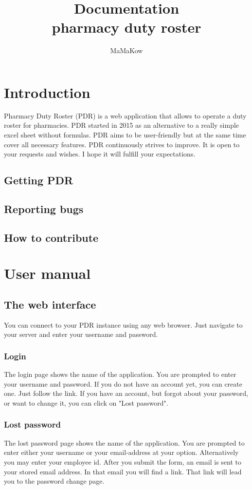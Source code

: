 \documentclass[12pt,a4paper,titlepage]{book}
\author{MaMaKow}
\title{Documentation \\pharmacy duty roster}
\begin{document}
\maketitle
\tableofcontents


\chapter{Introduction}
Pharmacy Duty Roster (PDR) is a web application that allows to operate a duty roster for pharmacies.
PDR started in 2015 as an alternative to a really simple excel sheet without formulas.
PDR aims to be user-friendly but at the same time cover all necessary features.
PDR continuously strives to improve. It is open to your requests and wishes.
I hope it will fulfill your expectations.
\section{Getting PDR}
\section{Reporting bugs}
\section{How to contribute}


\chapter{User manual}


\section{The web interface}
You can connect to your PDR instance using any web browser. Just navigate to your server and enter your username and password.

\subsection{Login}
The login page shows the name of the application. You are prompted to enter your username and password.
If you do not have an account yet, you can create one. Just follow the link.
If you have an account, but forgot about your password, or want to change it, you can click on "Lost password".

\subsection{Lost password}
The lost password page shows the name of the application. You are prompted to enter either your username or your email-address at your option. Alternatively you may enter your employee id. 
After you submit the form, an email is sent to your stored email address.
In that email you will find a link. That link will lead you to the password change page.
\end{document}
